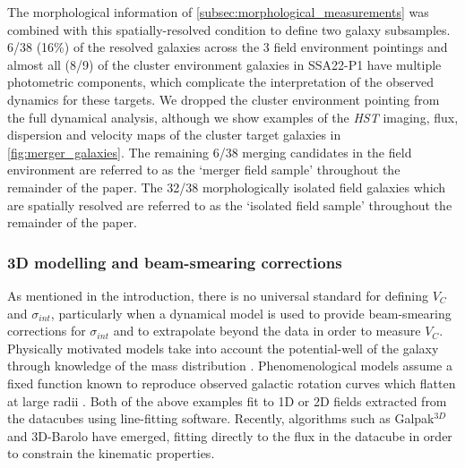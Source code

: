 \documentclass[fleqn,usenatbib]{mnras}
\begin{document}
The morphological information of \cref{subsec:morphological_measurements} was combined with this spatially-resolved condition to define two galaxy subsamples.
6/38 (16\%) of the resolved galaxies across the 3 field environment pointings and almost all (8/9) of the cluster environment galaxies in SSA22-P1 have multiple photometric components, which complicate the interpretation of the observed dynamics for these targets.
We dropped the cluster environment pointing from the full dynamical analysis, although we show examples of the {\em HST} imaging, flux, dispersion and velocity maps of the cluster target galaxies in \cref{fig:merger_galaxies}.
The remaining 6/38 merging candidates in the field environment are referred to as the `merger field sample' throughout the remainder of the paper.
The 32/38 morphologically isolated field galaxies which are spatially resolved are referred to as the `isolated field sample' throughout the remainder of the paper.

\subsubsection{3D modelling and beam-smearing corrections}\label{subsec:3d_modelling}

As mentioned in the introduction, there is no universal standard for defining $V_{C}$ and $\sigma_{int}$, particularly when a dynamical model is used to provide beam-smearing corrections for $\sigma_{int}$ and to extrapolate beyond the data in order to measure $V_{C}$.
Physically motivated models take into account the potential-well of the galaxy through knowledge of the mass distribution \citep[e.g.][]{Genzel2008,ForsterSchreiber2009,Gnerucci2011,Wisnioski2015,Swinbank2017}.
Phenomenological models assume a fixed function known to reproduce observed galactic rotation curves which flatten at large radii \citep[e.g.][]{Epinat2010,Epinat2012,Swinbank2012,Stott2016,Harrison2017}.
Both of the above examples fit to 1D or 2D fields extracted from the datacubes using line-fitting software.
Recently, algorithms such as Galpak$^{3D}$ \citep{Bouche2015} and 3D-Barolo \citep{DiTeodoro2015} have emerged, fitting directly to the flux in the datacube in order to constrain the kinematic properties.
\end{document}
